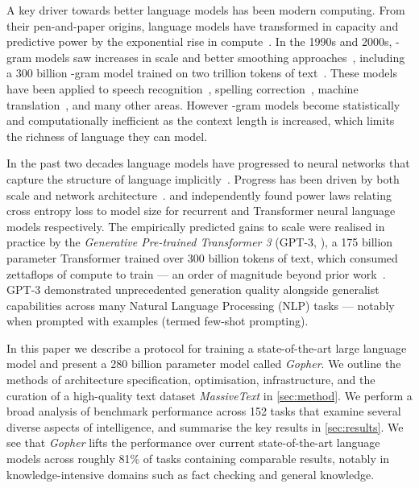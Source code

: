 \documentclass[11pt, a4paper, logo, internal, copyright, nonumbering]{deepmind}
\newcommand{\massivetext}{\textit{MassiveText}\xspace}
\newcommand{\gopher}{\textit{Gopher}\xspace}
\begin{document}
A key driver towards better language models has been modern computing. From their pen-and-paper origins, language models have transformed in capacity and predictive power by the exponential rise in compute~\citep{moore1965cramming}. In the 1990s and 2000s, -gram models saw increases in scale and better smoothing approaches~\citep{ney1994structuring}, including a 300 billion -gram model trained on two trillion tokens of text~\citep{brants2007large}.  These models have been applied to speech recognition~\citep{jelinek1997statistical}, spelling correction~\citep{brill2000improved}, machine translation~\citep{brown1990statistical}, and many other areas. However -gram models become statistically and computationally inefficient as the context length is increased, which limits the richness of language they can model.


In the past two decades language models have progressed to neural networks that capture the structure of language implicitly~\citep{bengio2003neural, mikolov2010recurrent, graves2013generating, jozefowicz2016exploring, radford2019language}.
Progress has been driven by both scale and network architecture~\citep{hochreiter1997long,bahdanau2014neural,vaswani2017attention}.
\citet{rosenfeld2020a} and \citet{kaplan2020scaling} independently found power laws relating cross entropy loss to model size for recurrent and Transformer neural language models respectively.  The empirically predicted gains to scale were realised in practice by the \textit{Generative Pre-trained Transformer 3} (GPT-3, \citet{gpt3}), a 175 billion parameter Transformer trained over 300 billion tokens of text, which consumed zettaflops of compute to train --- an order of magnitude beyond prior work~\citep{rosset2020turing}. GPT-3 demonstrated unprecedented generation quality alongside generalist capabilities across many Natural Language Processing (NLP) tasks --- notably when prompted with examples (termed few-shot prompting).


In this paper we describe a protocol for training a state-of-the-art large language model and present a 280 billion parameter model called \gopher. We outline the methods of architecture specification, optimisation, infrastructure, and the curation of a high-quality text dataset \massivetext in \autoref{sec:method}. We perform a broad analysis of benchmark performance across 152 tasks that examine several diverse aspects of intelligence, and summarise the key results in \autoref{sec:results}. We see that \gopher lifts the performance over current state-of-the-art language models across roughly 81\% of tasks containing comparable results, notably in knowledge-intensive domains such as fact checking and general knowledge. 
\end{document}
